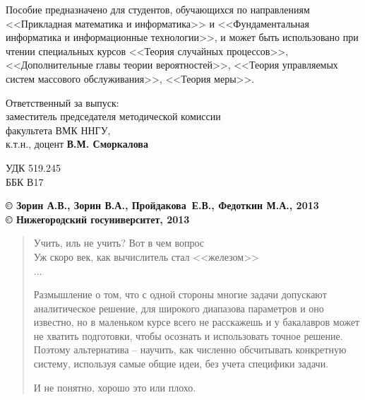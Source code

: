 \documentclass[10pt,oneside,final]{book}
\begin{document}
Пособие предназначено для студентов, обучающихся по
направлениям <<Прикладная математика и информатика>> и
<<Фундаментальная информатика и информационные технологии>>, и
может быть использовано при чтении  специальных курсов <<Теория случайных
процессов>>, <<Дополнительные главы теории вероятностей>>, <<Теория
управляемых систем массового обслуживания>>, <<Теория меры>>. 

\vfill

\begin{center}
  Ответственный за выпуск:\\
  заместитель председателя методической комиссии \\
  факультета ВМК ННГУ, \\ к.т.н., доцент \textbf{В.М. Сморкалова}
\end{center}

\vfill

\hfill \parbox{2.65cm}{
  \noindent УДК 519.245 \\ ББК В17 }

\vfill

\hfill 
\begin{minipage}{0.65\linewidth}\raggedright \noindent \bfseries
  \copyright{} Зорин А.В., Зорин В.А., Пройдакова~Е.В., Федоткин М.А.,
  2013  
  \\ \copyright{} Нижегородский госуниверситет, 2013
\end{minipage}

\newpage

\tableofcontents


\newpage

\begin{verse}
  Учить, иль не учить? Вот в чем вопрос\\
  Уж скоро век, как вычислитель стал <<железом>>\\
  ...

Размышление о том, что  с одной стороны многие задачи допускают аналитическое
решение, для широкого диапазова параметров и оно известно, но в маленьком курсе всего не расскажешь и у бакалавров
может не хватить подготовки, чтобы осознать и использовать точное
решение. Поэтому альтернатива -- научить, как численно обсчитывать конкретную
систему, используя самые общие идеи, без учета специфики задачи.

И не понятно, хорошо это или плохо.
\end{verse}
\end{document}
